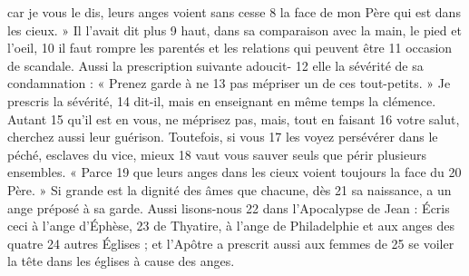 car je vous le dis, leurs anges voient sans cesse	 
8	 	la face de mon Père qui est dans les cieux. » Il l'avait dit plus	 
9	 	haut, dans sa comparaison avec la main, le pied et l'oeil,	 
10	 	il faut rompre les parentés et les relations qui peuvent être	 
11	 	occasion de scandale. Aussi la prescription suivante adoucit-	 
12	 	elle la sévérité de sa condamnation : « Prenez garde à ne	 
13	 	pas mépriser un de ces tout-petits. » Je prescris la sévérité,	 
14	 	dit-il, mais en enseignant en même temps la clémence. Autant	 
15	 	qu'il est en vous, ne méprisez pas, mais, tout en faisant	 
16	 	votre salut, cherchez aussi leur guérison. Toutefois, si vous	 
17	 	les voyez persévérer dans le péché, esclaves du vice, mieux	 
18	 	vaut vous sauver seuls que périr plusieurs ensembles. « Parce	 
19	 	que leurs anges dans les cieux voient toujours la face du	 
20	 	Père. » Si grande est la dignité des âmes que chacune, dès	 
21	 	sa naissance, a un ange préposé à sa garde. Aussi lisons-nous	 
22	 	dans l'Apocalypse de Jean : Écris ceci à l'ange d'Éphèse,	 
23	 	de Thyatire, à l'ange de Philadelphie et aux anges des quatre	 
24	 	autres Églises ; et l'Apôtre a prescrit aussi aux femmes de	 
25	 	se voiler la tête dans les églises à cause des anges.